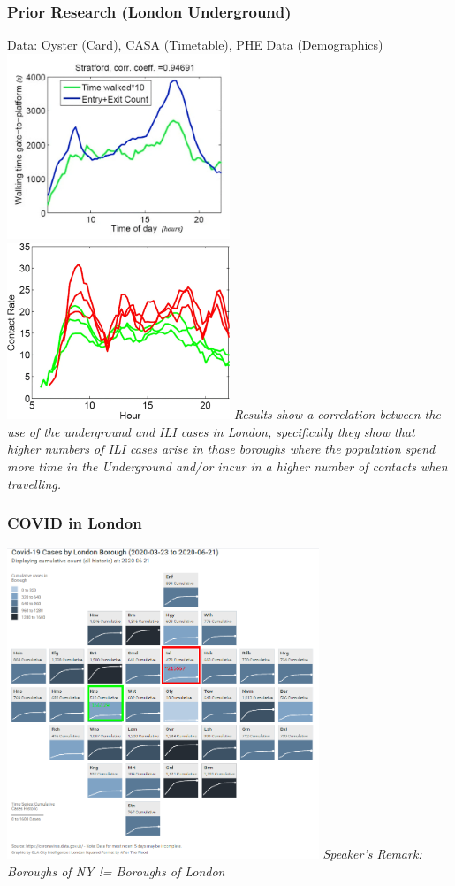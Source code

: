 \documentclass{beamer}
\begin{document}
\begin{frame}
\frametitle{Prior Research (London Underground)}
Data: Oyster (Card), CASA (Timetable), PHE Data (Demographics)\\
\includegraphics[width=0.5\textwidth]{Scratch_Visuals/London_Walking_time.png}%
\includegraphics[width=0.5\textwidth]{Scratch_Visuals/London_Borough_Comparison.png}
\textit{Results show a correlation between the use of the underground and ILI cases in London, specifically they show that higher numbers of ILI cases arise in those boroughs where the population spend more time in the Underground and/or incur in a higher number of contacts when travelling.}
 \cite{gosce_johansson_2018}
\end{frame}
\begin{frame}
\frametitle{COVID in London}
\includegraphics[width=0.7\textwidth]{Scratch_Visuals/London_Covid_Adapted.png}
\textit{Speaker's Remark: Boroughs of NY != Boroughs of London}
\end{frame}
\end{document}
